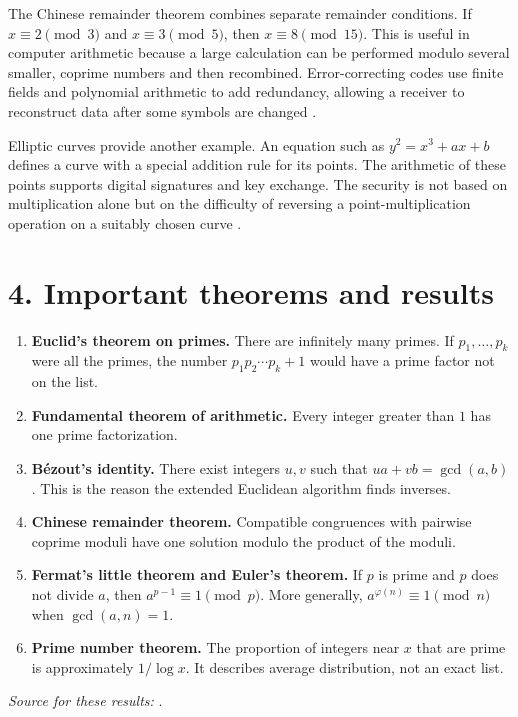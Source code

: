 The Chinese remainder theorem combines separate remainder conditions. If $x\equiv2\pmod3$ and $x\equiv3\pmod5$, then $x\equiv8\pmod{15}$. This is useful in computer arithmetic because a large calculation can be performed modulo several smaller, coprime numbers and then recombined. Error-correcting codes use finite fields and polynomial arithmetic to add redundancy, allowing a receiver to reconstruct data after some symbols are changed \cite{number_theory_ref2}.

Elliptic curves provide another example. An equation such as $y^2=x^3+ax+b$ defines a curve with a special addition rule for its points. The arithmetic of these points supports digital signatures and key exchange. The security is not based on multiplication alone but on the difficulty of reversing a point-multiplication operation on a suitably chosen curve \cite{number_theory_ref3}.

\section*{4. Important theorems and results}
\begin{enumerate}[leftmargin=*,itemsep=0.35em]
\item \textbf{Euclid's theorem on primes.} There are infinitely many primes. If $p_1,\ldots,p_k$ were all the primes, the number $p_1p_2\cdots p_k+1$ would have a prime factor not on the list.

\item \textbf{Fundamental theorem of arithmetic.} Every integer greater than $1$ has one prime factorization.

\item \textbf{Bézout's identity.} There exist integers $u,v$ such that $ua+vb=\gcd(a,b)$. This is the reason the extended Euclidean algorithm finds inverses.

\item \textbf{Chinese remainder theorem.} Compatible congruences with pairwise coprime moduli have one solution modulo the product of the moduli.

\item \textbf{Fermat's little theorem and Euler's theorem.} If $p$ is prime and $p$ does not divide $a$, then $a^{p-1}\equiv1\pmod p$. More generally, $a^{\varphi(n)}\equiv1\pmod n$ when $\gcd(a,n)=1$.

\item \textbf{Prime number theorem.} The proportion of integers near $x$ that are prime is approximately $1/\log x$. It describes average distribution, not an exact list.
\end{enumerate}
\noindent\emph{Source for these results:} \cite{number_theory_ref1}.

